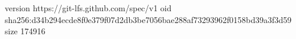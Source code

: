 version https://git-lfs.github.com/spec/v1
oid sha256:d34b294ecde8f0e379f07d2db3be7056bae288af73293962f0158bd39a3f3d59
size 174916
